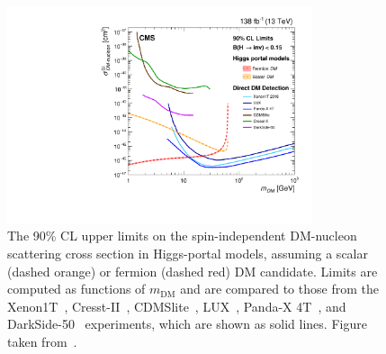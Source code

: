 \begin{figure}[htbp]
    \centering
    \includegraphics[width=0.8\textwidth]{from_paper/DM_nucleon_xs.pdf}
    \caption{The 90\% CL upper limits on the spin-independent DM-nucleon scattering cross 
    section in Higgs-portal models, assuming a scalar (dashed orange) or
    fermion (dashed red) DM candidate. Limits are computed as functions
    of $m_{\mathrm{DM}}$ and are compared to those from the
    Xenon1T~\cite{Aprile:2018dbl}, Cresst-II~\cite{Angloher:2015ewa},
    CDMSlite~\cite{Agnese:2015nto}, LUX~\cite{Akerib:2016vxi}, Panda-X
    4T~\cite{PandaX-4T:2021bab}, and DarkSide-50~\cite{Agnes:2018ves}
    experiments, which are shown as solid lines. Figure taken from~\cite{VBFHinvAnalysisPaper}.}
    \label{fig:DMlim}
\end{figure}